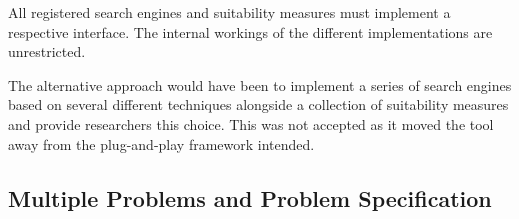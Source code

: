 All registered search engines and suitability measures must implement a respective interface.
The internal workings of the different implementations are unrestricted.

The alternative approach would have been to implement a series of search engines based on several different techniques alongside a collection of suitability measures and provide researchers this choice.
This was not accepted as it moved the tool away from the plug-and-play framework intended.

% 


\subsection{Multiple Problems and Problem Specification}
\label{sec:problemman}

